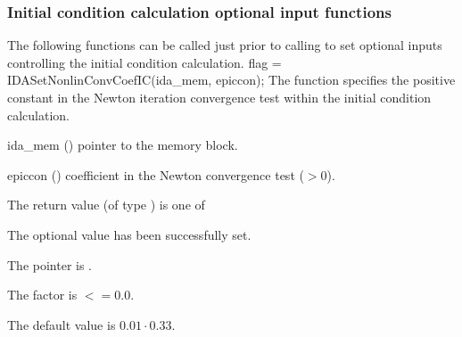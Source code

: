{\subsubsection{Initial condition calculation optional input functions}\label{sss:optin_iccalc}
The following functions can be called just prior to calling 
to set optional inputs controlling the initial condition calculation.
{
flag = IDASetNonlinConvCoefIC(ida\_mem, epiccon);
}
{
  The function  specifies the positive constant in
  the Newton iteration convergence test within the initial condition calculation.
}
{
  \begin{args}
  \item[ida\_mem] ()
    pointer to the {\idas} memory block.
  \item[epiccon] ()
    coefficient in the Newton convergence test ($>0$).
  \end{args}
}
{
  The return value  (of type ) is one of
  \begin{args}
  \item[\Id{IDA\_SUCCESS}]
    The optional value has been successfully set.
  \item[\Id{IDA\_MEM\_NULL}]
    The  pointer is .
  \item[\Id{IDA\_ILL\_INPUT}]
    The  factor is $<= 0.0$.
  \end{args}
}
{
  The default value is $0.01 \cdot 0.33$.

}}
